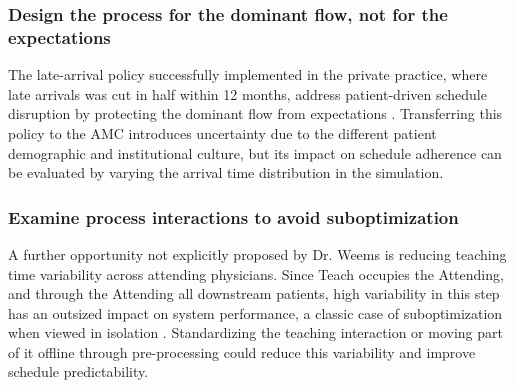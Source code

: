 \subsubsection{Design the process for the dominant flow, not for the expectations}

The late-arrival policy successfully implemented in the private practice, where late arrivals was cut in half within 12 months, address patient-driven schedule disruption by protecting the dominant flow from expectations \parencite[p. 99]{pensumbok}. Transferring this policy to the AMC introduces uncertainty due to the different patient demographic and institutional culture, but its impact on schedule adherence can be evaluated by varying the arrival time distribution in the simulation. 


\subsubsection{Examine process interactions to avoid suboptimization}

A further opportunity not explicitly proposed by Dr. Weems is reducing teaching time variability across attending physicians. Since Teach occupies the Attending, and through the Attending all downstream patients, high variability in this step has an outsized impact on system performance, a classic case of suboptimization when viewed in isolation \parencite[p. 99-100]{pensumbok}. Standardizing the teaching interaction or moving part of it offline through pre-processing could reduce this variability and improve schedule predictability. 
